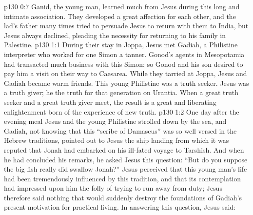 \vs p130 0:7 Ganid, the young man, learned much from Jesus during this long and intimate association. They developed a great affection for each other, and the lad’s father many times tried to persuade Jesus to return with them to India, but Jesus always declined, pleading the necessity for returning to his family in Palestine.
\vs p130 1:1 During their stay in Joppa, Jesus met Gadiah, a Philistine interpreter who worked for one Simon a tanner. Gonod’s agents in Mesopotamia had transacted much business with this Simon; so Gonod and his son desired to pay him a visit on their way to Caesarea. While they tarried at Joppa, Jesus and Gadiah became warm friends. This young Philistine was a truth seeker. Jesus was a truth giver; he  the truth for that generation on Urantia. When a great truth seeker and a great truth giver meet, the result is a great and liberating enlightenment born of the experience of new truth.
\vs p130 1:2 One day after the evening meal Jesus and the young Philistine strolled down by the sea, and Gadiah, not knowing that this “scribe of Damascus” was so well versed in the Hebrew traditions, pointed out to Jesus the ship landing from which it was reputed that Jonah had embarked on his ill\hyp{}fated voyage to Tarshish. And when he had concluded his remarks, he asked Jesus this question: “But do you suppose the big fish really did swallow Jonah?” Jesus perceived that this young man’s life had been tremendously influenced by this tradition, and that its contemplation had impressed upon him the folly of trying to run away from duty; Jesus therefore said nothing that would suddenly destroy the foundations of Gadiah’s present motivation for practical living. In answering this question, Jesus said: 
